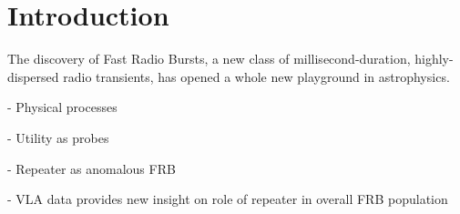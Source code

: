 \section{Introduction}

The discovery of Fast Radio Bursts, a new class of millisecond-duration, highly-dispersed radio transients, has opened a whole new playground in astrophysics. 

- Physical processes

- Utility as probes

- Repeater as anomalous FRB

- VLA data provides new insight on role of repeater in overall FRB population